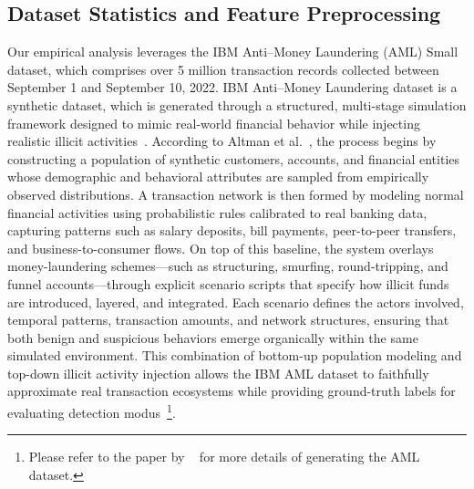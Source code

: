 \documentclass[11pt,english]{article}
\begin{document}
\subsection{Dataset Statistics and Feature Preprocessing}
Our empirical analysis leverages the IBM Anti–Money Laundering (AML) Small dataset, which comprises over 5 million transaction records collected between September 1 and September 10, 2022. IBM Anti–Money Laundering dataset is a synthetic dataset, which is generated through a structured, multi-stage simulation framework designed to mimic real-world financial behavior while injecting realistic illicit activities~\parencite{altman2023realistic}. According to Altman et al.~\parencite*{altman2023realistic}, the process begins by constructing a population of synthetic customers, accounts, and financial entities whose demographic and behavioral attributes are sampled from empirically observed distributions. A transaction network is then formed by modeling normal financial activities using probabilistic rules calibrated to real banking data, capturing patterns such as salary deposits, bill payments, peer-to-peer transfers, and business-to-consumer flows. On top of this baseline, the system overlays money-laundering schemes—such as structuring, smurfing, round-tripping, and funnel accounts—through explicit scenario scripts that specify how illicit funds are introduced, layered, and integrated. Each scenario defines the actors involved, temporal patterns, transaction amounts, and network structures, ensuring that both benign and suspicious behaviors emerge organically within the same simulated environment. This combination of bottom-up population modeling and top-down illicit activity injection allows the IBM AML dataset to faithfully approximate real transaction ecosystems while providing ground-truth labels for evaluating detection modus~\footnote{Please refer to the paper by ~\parencite{altman2023realistic} for more details of generating the AML dataset.}.

\begin{table}[h!]
\centering
\caption{Statistics of transaction by country}
\label{tab:country_graph_stats}
\end{table}
\end{document}
